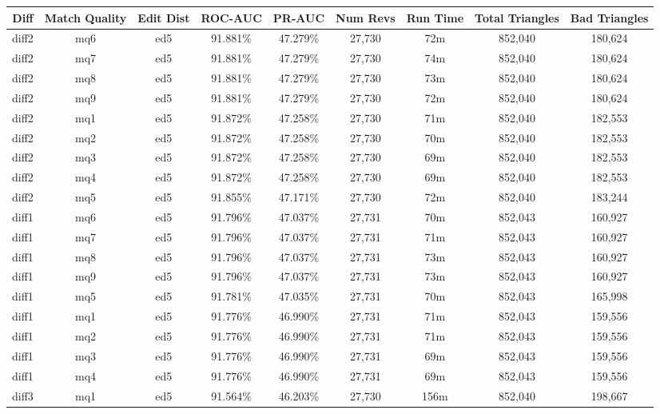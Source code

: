 \begin{sidewaystable}[!tp]
  \begin{center}
    \begin{tabular}{|c|c|c||c|c||c|c|c|c|}
\hline
Diff & Match Quality & Edit Dist
        & ROC-AUC & PR-AUC
        & Num Revs & Run Time
        & Total Triangles & Bad Triangles \\
\hline
\hline
diff2 & mq6 & ed5 & 91.881\% & 47.279\% & 27,730 & 72m & 852,040 & 180,624 \\
diff2 & mq7 & ed5 & 91.881\% & 47.279\% & 27,730 & 74m & 852,040 & 180,624 \\
diff2 & mq8 & ed5 & 91.881\% & 47.279\% & 27,730 & 73m & 852,040 & 180,624 \\
diff2 & mq9 & ed5 & 91.881\% & 47.279\% & 27,730 & 72m & 852,040 & 180,624 \\
diff2 & mq1 & ed5 & 91.872\% & 47.258\% & 27,730 & 71m & 852,040 & 182,553 \\
diff2 & mq2 & ed5 & 91.872\% & 47.258\% & 27,730 & 70m & 852,040 & 182,553 \\
diff2 & mq3 & ed5 & 91.872\% & 47.258\% & 27,730 & 69m & 852,040 & 182,553 \\
diff2 & mq4 & ed5 & 91.872\% & 47.258\% & 27,730 & 69m & 852,040 & 182,553 \\
diff2 & mq5 & ed5 & 91.855\% & 47.171\% & 27,730 & 72m & 852,040 & 183,244 \\
diff1 & mq6 & ed5 & 91.796\% & 47.037\% & 27,731 & 70m & 852,043 & 160,927 \\
diff1 & mq7 & ed5 & 91.796\% & 47.037\% & 27,731 & 71m & 852,043 & 160,927 \\
diff1 & mq8 & ed5 & 91.796\% & 47.037\% & 27,731 & 73m & 852,043 & 160,927 \\
diff1 & mq9 & ed5 & 91.796\% & 47.037\% & 27,731 & 73m & 852,043 & 160,927 \\
diff1 & mq5 & ed5 & 91.781\% & 47.035\% & 27,731 & 70m & 852,043 & 165,998 \\
diff1 & mq1 & ed5 & 91.776\% & 46.990\% & 27,731 & 71m & 852,043 & 159,556 \\
diff1 & mq2 & ed5 & 91.776\% & 46.990\% & 27,731 & 71m & 852,043 & 159,556 \\
diff1 & mq3 & ed5 & 91.776\% & 46.990\% & 27,731 & 69m & 852,043 & 159,556 \\
diff1 & mq4 & ed5 & 91.776\% & 46.990\% & 27,731 & 69m & 852,043 & 159,556 \\
diff3 & mq1 & ed5 & 91.564\% & 46.203\% & 27,730 & 156m & 852,040 & 198,667 \\

\end{tabular}
\end{center}
\end{sidewaystable}
